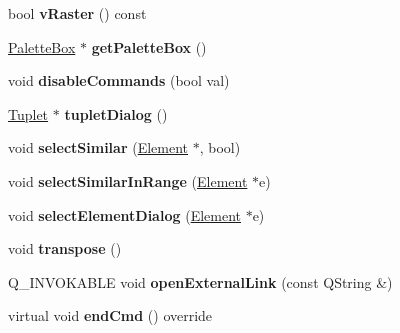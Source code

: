 \begin{DoxyCompactItemize}
bool {\bfseries v\+Raster} () const
\item 
\mbox{\label{class_ms_1_1_muse_score_a3227f6265fd7ed3b290d475eaa3eea44}} 
\hyperlink{class_ms_1_1_palette_box}{Palette\+Box} $\ast$ {\bfseries get\+Palette\+Box} ()
\item 
\mbox{\label{class_ms_1_1_muse_score_a65d272a089d6fea2c666d235afbee2e2}} 
void {\bfseries disable\+Commands} (bool val)
\item 
\mbox{\label{class_ms_1_1_muse_score_a5a5b818bec79b0561a8e8220f4329262}} 
\hyperlink{class_ms_1_1_tuplet}{Tuplet} $\ast$ {\bfseries tuplet\+Dialog} ()
\item 
\mbox{\label{class_ms_1_1_muse_score_a139d1cb53846d0bb59d5247c2e2911bb}} 
void {\bfseries select\+Similar} (\hyperlink{class_ms_1_1_element}{Element} $\ast$, bool)
\item 
\mbox{\label{class_ms_1_1_muse_score_a445742fe90fef7dfee95c97d52e790b8}} 
void {\bfseries select\+Similar\+In\+Range} (\hyperlink{class_ms_1_1_element}{Element} $\ast$e)
\item 
\mbox{\label{class_ms_1_1_muse_score_a9aec697e4ed122b2d20782b2491722e8}} 
void {\bfseries select\+Element\+Dialog} (\hyperlink{class_ms_1_1_element}{Element} $\ast$e)
\item 
\mbox{\label{class_ms_1_1_muse_score_a189918382e20fbdf70edcc7a8e8ffe4d}} 
void {\bfseries transpose} ()
\item 
\mbox{\label{class_ms_1_1_muse_score_a42621c90d7302c51fdd9b3ebd0ecb2b8}} 
Q\+\_\+\+I\+N\+V\+O\+K\+A\+B\+LE void {\bfseries open\+External\+Link} (const Q\+String \&)
\item 
\mbox{\label{class_ms_1_1_muse_score_a37ebaa3a3a0b726c3ca54c50835ef889}} 
virtual void {\bfseries end\+Cmd} () override
\item 
\mbox{\label{class_ms_1_1_muse_score_ad6f5e504fc0b9dc4a4d3dafdb57be172}} 

\end{DoxyCompactItemize}
